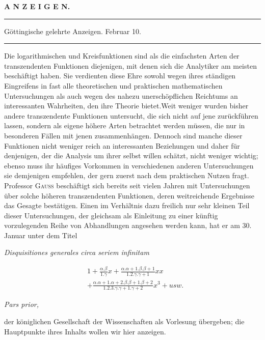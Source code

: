 \clearpage{}
\begin{center}\textbf{A N Z E I G E N.}\end{center}
\par{}\begin{center}
\rule{0.52\linewidth}{0.3pt}\par\medskip
Göttingische gelehrte Anzeigen. Februar 10.\par\medskip
\rule{0.52\linewidth}{0.3pt}
\end{center}

Die logarithmischen und Kreisfunktionen sind als die einfachsten Arten der transzendenten Funktionen diejenigen, mit denen sich die Analytiker am meisten beschäftigt haben. Sie verdienten diese Ehre sowohl wegen ihres ständigen Eingreifens in fast alle theoretischen und praktischen mathematischen Untersuchungen als auch wegen des nahezu unerschöpflichen Reichtums an interessanten Wahrheiten, den ihre Theorie bietet.\quad Weit weniger wurden bisher andere transzendente Funktionen untersucht, die sich nicht auf jene zurückführen lassen, sondern als eigene höhere Arten betrachtet werden müssen, die nur in besonderen Fällen mit jenen zusammenhängen. Dennoch sind manche dieser Funktionen nicht weniger reich an interessanten Beziehungen und daher für denjenigen, der die Analysis um ihrer selbst willen schätzt, nicht weniger wichtig; ebenso muss ihr häufiges Vorkommen in verschiedenen anderen Untersuchungen sie demjenigen empfehlen, der gern zuerst nach dem praktischen Nutzen fragt. Professor \textsc{Gauss} beschäftigt sich bereits seit vielen Jahren mit Untersuchungen über solche höheren transzendenten Funktionen, deren weitreichende Ergebnisse das Gesagte bestätigen. Einen im Verhältnis dazu freilich nur sehr kleinen Teil dieser Untersuchungen, der gleichsam als Einleitung zu einer künftig vorzulegenden Reihe von Abhandlungen angesehen werden kann, hat er am 30. Januar unter dem Titel

\begin{center}\emph{Disquisitiones generales circa seriem infinitam}\end{center}
\[
\begin{aligned}&1+\frac{\alpha.\beta}{1.\gamma}x
+\frac{\alpha.\alpha+1.\beta.\beta+1}{1.2.\gamma.\gamma+1}xx
\\[5pt]&+\frac{\alpha.\alpha+1.\alpha+2.\beta.\beta+1.\beta+2}{1.2.3.\gamma.\gamma+1.\gamma+2}x^3+\mathit{usw.}\end{aligned}
\]
\begin{center}\emph{Pars prior,}\end{center}
der königlichen Gesellschaft der Wissenschaften als Vorlesung übergeben; die Hauptpunkte ihres Inhalts wollen wir hier anzeigen.

